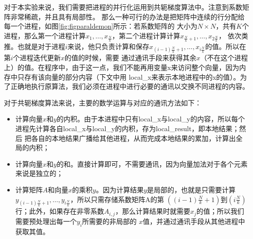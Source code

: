 对于本实验来说，我们需要把进程的并行化运用到共轭梯度算法中。注意到系数矩阵非常稀疏，并且具有局部性。
那么一种可行的办法是把矩阵中连续的行分配给每一个进程，如图\ref{fig:figparaldemon}所示：若系数矩阵的
大小为$N\times N$，共有$K$个进程，那么第一个进程计算$x_1,\ldots,x_{\frac{N}{k}}$，第二个进程计算计算$x_{\frac{N}{k}+1},\ldots,x_{2\frac{N}{k}}$，
依次类推。也就是对于进程$i$来说，他只负责计算和保存$x_{(i-1)\frac{N}{k}+1},\ldots,x_{i\frac{N}{k}}$的值。所以在第$i$个进程迭代更新$x$的值的时候，需要
通过通讯手段来获得其余$x$（不在这个进程上）的值。在程序中，由于这一点，我们不能再用变量x来访问整个向量，因为内存中只存有该向量的部分内容（下文中用
local\_x来表示本地进程中的x的值）。为了正确地执行原算法，我们必须在进程中进行必要的通讯以交换不同进程的内容。

对于共轭梯度算法来说，主要的数学运算与对应的通讯方法如下：

\begin{itemize}
\item 计算向量$x$和$y$的内积。由于本进程中只有local\_x与local\_y的内容，所以每个进程先计算各自local\_x与local\_y的内积，存为local\_result，即本地结果；然后
把各自的本地结果广播给其他进程，从而完成本地结果的累加，计算出全局的内积；
\item 计算向量$x$和$y$的和。直接计算即可，不需要通讯，因为向量加法对于各个元素来说是独立的；
\item 计算矩阵$A$和向量$x$的乘积$y$。因为计算结果$y$是局部的，也就是只需要计算$y_{(i-1)\frac{N}{k}+1},\ldots,y_{i\frac{N}{k}}$，所以只需存储系数矩阵A的第
$((i-1)\frac{N}{k}+1)$到$(i\frac{N}{k})$行；此外，如果存在非零系数$A_{i,j}$，那么计算结果时就需要$x_j$的值；所以我们需要预处理出每一个$y_i$所需要的非局部的
$x$值，并通过通讯手段从其他进程中获取其值。
\end{itemize}


